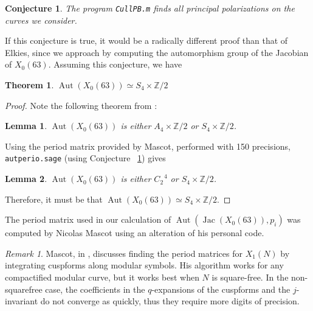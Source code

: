 \documentclass[12pt,reqno]{amsart}
\DeclareMathOperator{\Aut}{Aut}
\DeclareMathOperator{\Jac}{Jac}
\newcommand{\Z}{\mathbb{Z}}
\newtheorem*{thm*}{Theorem}
\newtheorem*{lemma*}{Lemma}
\newtheorem{conjecture}[theorem]{Conjecture}
\theoremstyle{definition}
\theoremstyle{remark}
\newtheorem*{remark}{Remark}
\begin{document}

\begin{conjecture} \label{63conj} The program \texttt{CullPB.m} finds all principal polarizations on the curves we consider. \end{conjecture}

If this conjecture is true, it would be a radically different proof than that of Elkies, since we approach by computing the automorphism group of the Jacobian of $X_0(63)$. Assuming this conjecture, we have

\begin{thm*} $\Aut(X_0(63)) \simeq S_4 \times \Z/2$ \end{thm*} 

\begin{proof} Note the following theorem from \cite{km}: 

\begin{lemma*} $\Aut(X_0(63))$ is either $A_4 \times \Z/2$ or $S_4 \times \Z/2$. 
\end{lemma*}

Using the period matrix provided by Mascot, performed with 150 precisions, \texttt{autperio.sage} (using Conjecture ~\ref{63conj}) gives

\begin{lemma*} $\Aut(X_0(63))$ is either $C_2^{\text{ }4}$ or $S_4 \times \Z/2$.
\end{lemma*}

Therefore, it must be that $\Aut(X_0(63)) \simeq S_4 \times \Z/2$. 
\end{proof} 

\vspace{+10pt} 
The period matrix used in our calculation of $\Aut(\Jac(X_0(63)), p_i)$ was computed by Nicolas Mascot using an alteration of his personal code.

\begin{remark} Mascot, in \cite{n}, discusses finding the period matrices for $X_1(N)$ by integrating cuspforms along modular symbols. His algorithm works for any compactified modular curve, but it works best when $N$ is square-free. In the non-squarefree case, the coefficients in the $q$-expansions of the cuspforms and the $j$-invariant do not converge as quickly, thus they require more digits of precision. \end{remark}
\end{document}
